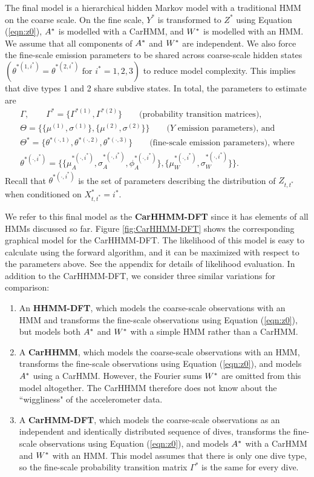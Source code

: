 The final model is a hierarchical hidden Markov model with a traditional HMM on the coarse scale. On the fine scale, $Y^*$ is transformed to $Z^*$ using Equation (\ref{eqn:z0}), $A^*$ is modelled with a CarHMM, and $W^*$ is modelled with an HMM. We assume that all components of $A^*$ and $W^*$ are independent. We also force the fine-scale emission parameters to be shared across coarse-scale hidden states $\left(\theta^{*(1,i^*)} = \theta^{*(2,i^*)} \text{ for } i^* = 1,2,3\right)$ to reduce model complexity. This implies that dive types 1 and 2 share subdive states. In total, the parameters to estimate are
%
\begin{gather*}
    \Gamma, \qquad \Gamma^{*} = \{\Gamma^{*(1)},\Gamma^{*(2)}\} \qquad \text{(probability transition matrices)}, \\
    \Theta = \{\{\mu^{(1)},\sigma^{(1)}\},\{\mu^{(2)},\sigma^{(2)}\}\} \qquad \text{($Y$ emission parameters), and} \\
    \Theta^* = \{\theta^{*(\cdot,1)},\theta^{*(\cdot,2)},\theta^{*(\cdot,3)}\}  \qquad \text{(fine-scale emission parameters), where} \\
    \theta^{*(\cdot,i^*)} =  \{\{\mu_A^{*(\cdot,i^*)},\sigma_A^{*(\cdot,i^*)},\phi_A^{*(\cdot,i^*)}\},\{\mu_W^{*(\cdot,i^*)},\sigma_W^{*(\cdot,i^*)}\}\}.
\end{gather*}
%
Recall that $\theta^{*(\cdot,i^*)}$ is the set of parameters describing the distribution of $Z_{t,t^*}$ when conditioned on $X^*_{t,t^*} = i^*$. 

We refer to this final model as the \textbf{CarHHMM-DFT} since it has elements of all HMMs discussed so far. Figure \ref{fig:CarHHMM-DFT} shows the corresponding graphical model for the CarHHMM-DFT. The likelihood of this model is easy to calculate using the forward algorithm, and it can be maximized with respect to the parameters above. See the appendix for details of likelihood evaluation. In addition to the CarHHMM-DFT, we consider three similar variations for comparison:
\begin{enumerate}
    \item An \textbf{HHMM-DFT}, which models the coarse-scale observations with an HMM and transforms the fine-scale observations using Equation (\ref{eqn:z0}), but models both $A^*$ and $W^*$ with a simple HMM rather than a CarHMM.
    \item A \textbf{CarHHMM}, which models the coarse-scale observations with an HMM, transforms the fine-scale observations using Equation (\ref{eqn:z0}), and models $A^*$ using a CarHMM. However, the Fourier sums $W^*$ are omitted from this model altogether. The CarHHMM therefore does not know about the ``wiggliness" of the accelerometer data.
    \item A \textbf{CarHMM-DFT}, which models the coarse-scale observations as an independent and identically distributed sequence of dives, transforms the fine-scale observations using Equation (\ref{eqn:z0}), and models $A^*$ with a CarHMM and $W^*$ with an HMM. This model assumes that there is only one dive type, so the fine-scale probability transition matrix $\Gamma^*$ is the same for every dive. 
\end{enumerate}

